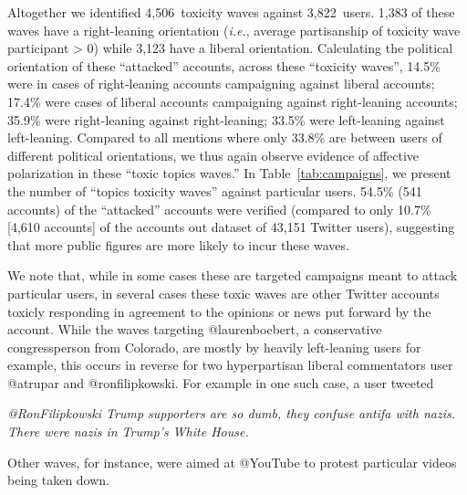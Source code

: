Altogether we identified 4,506~toxicity waves against 3,822~users. 1,383 of these waves have a right-leaning orientation (\textit{i.e.}, average partisanship of toxicity wave participant > 0) while 3,123 have a liberal orientation. Calculating the political orientation of these ``attacked'' accounts, across these ``toxicity waves'', 14.5\% were in cases of right-leaning accounts campaigning against liberal accounts; 17.4\% were cases of liberal accounts campaigning against right-leaning accounts; 35.9\% were right-leaning against right-leaning; 33.5\% were left-leaning against left-leaning. Compared to all mentions where only 33.8\% are between users of different political orientations, we thus again observe evidence of affective polarization in these ``toxic topics waves.'' In Table~\ref{tab:campaigns}, we present the number of ``topics toxicity waves'' against particular users. 54.5\% (541 accounts) of the ``attacked'' accounts were verified (compared to only 10.7\% [4,610 accounts] of the accounts out dataset of 43,151 Twitter users),  suggesting that more public figures are more likely to incur these waves.

We note that, while in some cases these are targeted campaigns meant to attack particular users, in several cases these toxic waves are other Twitter accounts toxicly responding in agreement to the opinions or news put forward by the account. While the waves targeting @laurenboebert, a conservative congressperson from Colorado, are mostly by heavily left-leaning users for example, this occurs in reverse for two hyperpartisan liberal commentators user @atrupar and  @ronfilipkowski. For example in one such case, a user tweeted
\begin{displayquote}
\small
\textit{@RonFilipkowski Trump supporters are so dumb, they confuse antifa with nazis. There were nazis in Trump's White House.}
\end{displayquote}
Other waves, for instance, were aimed at @YouTube to protest particular videos being taken down.  




\clearpage
\newpage

